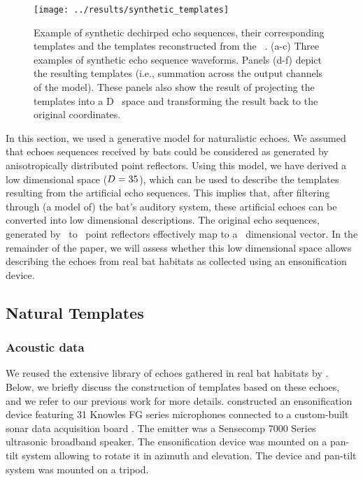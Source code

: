 \documentclass[preprint,5p]{elsarticle}
\begin{document}
\begin{figure}[tb]
	\centering
	\texttt{[image: ../results/synthetic\_templates]}
	\caption{Example of synthetic dechirped echo sequences, their corresponding templates and the templates reconstructed from the \pca\ \pcs. (a-c) Three examples of synthetic echo sequence waveforms. Panels (d-f) depict the resulting templates (i.e., summation across the output channels of the \citet{Wiegrebe2008} model). These panels also show the result of projecting the templates into a \pca D \pc\ space and transforming the result back to the original coordinates.}
	\label{fig:synthetictemplates}
\end{figure}

In this section, we used a generative model for naturalistic echoes. We assumed that echoes sequences received by bats could be considered as generated by anisotropically distributed point reflectors. Using this model, we have derived a low dimensional space ($D = 35$), which can be used to describe the templates resulting from the artificial echo sequences. This implies that, after filtering through (a model of) the bat's auditory system, these artificial echoes can be converted into low dimensional descriptions. The original echo sequences, generated by \MinDiracs\ to \MaxDiracs\ point reflectors effectively map to a \pca\ dimensional vector. In the remainder of the paper, we will assess whether this low dimensional space allows describing the echoes from real bat habitats as collected using an ensonification device.

\subsection{Natural Templates}

\subsubsection{Acoustic data}

We reused the extensive library of echoes gathered in real bat habitats by \citet{Vanderelst2016}. Below, we briefly discuss the construction of templates based on these echoes, and we refer to our previous work for more details. \citet{Vanderelst2016} constructed an ensonification device featuring 31 Knowles FG series microphones connected to a custom-built sonar data acquisition board \citep{Steckel2013a}. The emitter was a Sensecomp 7000 Series ultrasonic broadband speaker. The ensonification device was mounted on a pan-tilt system allowing to rotate it in azimuth and elevation. The device and pan-tilt system was mounted on a tripod.
\end{document}

